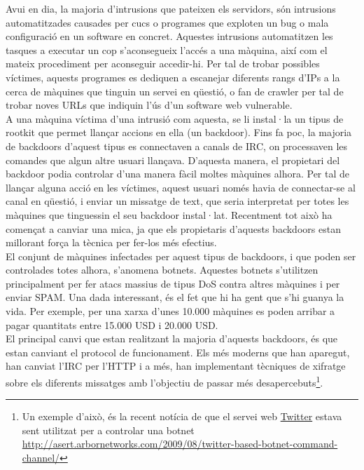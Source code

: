 Avui en dia, la majoria d'intrusions que pateixen els servidors, són intrusions automatitzades causades per cucs o 
programes que exploten un bug o mala configuració en un software en concret. Aquestes intrusions automatitzen les 
tasques a executar un cop s'aconsegueix l'accés a una màquina, així com el mateix procediment per aconseguir accedir-hi. 
Per tal de trobar possibles víctimes, aquests programes
es dediquen a escanejar diferents rangs d'IPs a la cerca de màquines que tinguin un servei en qüestió, o 
fan de crawler per tal de trobar noves URLs que indiquin l'ús d'un software web vulnerable. \\

A una màquina víctima d'una intrusió com aquesta, se li instal·la un tipus de rootkit que permet llançar accions en 
ella (un backdoor). Fins fa poc, la majoria de backdoors d'aquest tipus es connectaven a canals de IRC, on 
processaven les comandes que algun altre usuari llançava. D'aquesta manera, el propietari del backdoor podia controlar 
d'una manera fàcil moltes màquines alhora. Per tal de llançar alguna acció en les víctimes, aquest usuari només havia de 
connectar-se al canal en qüestió, i 
enviar un missatge de text, que seria interpretat per totes les màquines que tinguessin el seu backdoor instal·lat. 
Recentment tot això ha començat a canviar una mica, ja que els propietaris d'aquests backdoors estan millorant força la tècnica
per fer-los més efectius. \\

El conjunt de màquines infectades per aquest tipus de backdoors, i que poden ser controlades totes alhora, s'anomena
botnets. Aquestes botnets s'utilitzen principalment per fer atacs massius de tipus DoS contra altres màquines i per enviar SPAM. 
Una dada interessant, és el fet que hi ha gent que s'hi guanya la vida. Per exemple, per una xarxa d'unes 10.000 màquines
es poden arribar a pagar quantitats entre 15.000 USD i 20.000 USD. \\

El principal canvi que estan realitzant la majoria d'aquests backdoors, és que estan canviant el protocol de funcionament. Els
més moderns que han aparegut, han canviat l'IRC per l'HTTP i a més, han implementant tècniques de xifratge sobre els diferents 
missatges amb l'objectiu de passar més desapercebuts\footnote{Un exemple d'això, és la recent notícia de que el servei web 
\href{http://twitter.com/}{Twitter} estava sent utilitzat per a controlar una botnet \url{http://asert.arbornetworks.com/2009/08/twitter-based-botnet-command-channel/}}. \\

